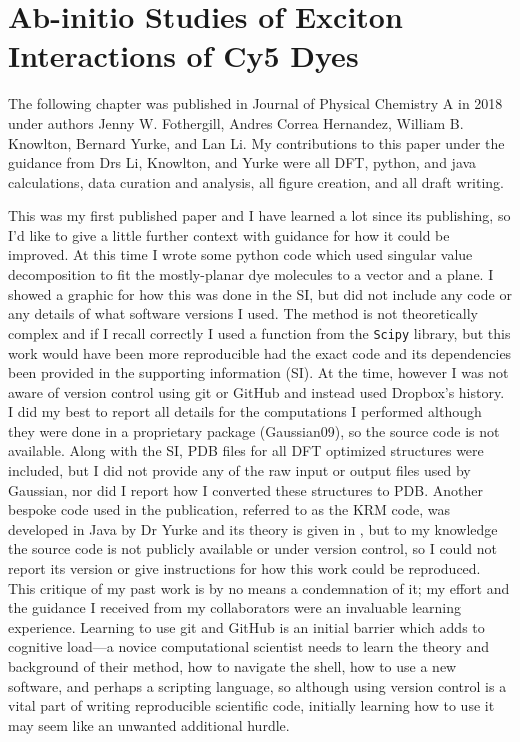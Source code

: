 \chapter{Ab-initio Studies of Exciton Interactions of Cy5 Dyes }
\label{chap:ab-initio}

The following chapter was published in Journal of Physical Chemistry A in 2018 under authors Jenny W. Fothergill, Andres Correa Hernandez, William B. Knowlton, Bernard Yurke, and Lan Li. My contributions to this paper under the guidance from Drs Li, Knowlton, and Yurke were all DFT, python, and java calculations, data curation and analysis, all figure creation, and all draft writing.

This was my first published paper and I have learned a lot since its publishing, so I'd like to give a little further context with guidance for how it could be improved. 
At this time I wrote some python code which used singular value decomposition to fit the mostly-planar dye molecules to a vector and a plane. 
I showed a graphic for how this was done in the SI, but did not include any code or any details of what software versions I used. 
The method is not theoretically complex and if I recall correctly I used a function from the \texttt{Scipy} library, but this work would have been more reproducible had the exact code and its dependencies been provided in the supporting information (SI).
At the time, however I was not aware of version control using git or GitHub and instead used Dropbox's history.
I did my best to report all details for the computations I performed although they were done in a proprietary package (Gaussian09), so the source code is not available.
Along with the SI, PDB files for all DFT optimized structures were included, but I did not provide any of the raw input or output files used by Gaussian, nor did I report how I converted these structures to PDB.
Another bespoke code used in the publication, referred to as the KRM code, was developed in Java by Dr Yurke and its theory is given in \citet[Supporting Information]{Cannon2017}, but to my knowledge the source code is not publicly available or under version control, so I could not report its version or give instructions for how this work could be reproduced.
This critique of my past work is by no means a condemnation of it; my effort and the guidance I received from my collaborators were an invaluable learning experience.
Learning to use git and GitHub is an initial barrier which adds to cognitive load---a novice computational scientist needs to learn the theory and background of their method, how to navigate the shell, how to use a new software, and perhaps a scripting language, so although using version control is a vital part of writing reproducible scientific code, initially learning how to use it may seem like an unwanted additional hurdle.
